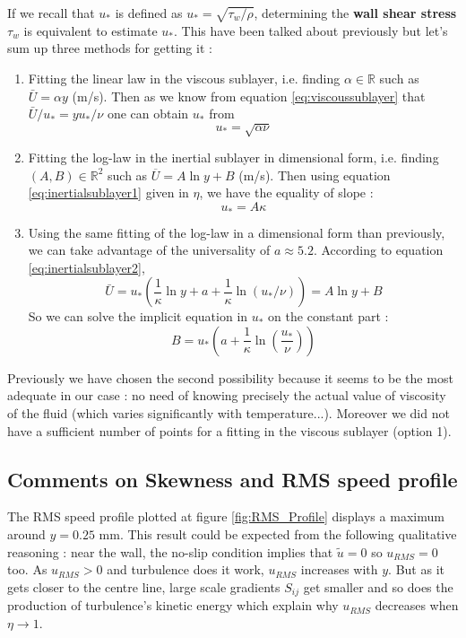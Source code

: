 \documentclass[12pt]{article}
\begin{document}
If we recall that $u_*$ is defined as $u_* = \sqrt{\tau_w/\rho}$, determining the \textbf{wall shear stress} $\tau_w$ is equivalent to estimate $u_*$. This have been talked about previously but let's sum up three methods for getting it :
\begin{enumerate}
    \item Fitting the linear law in the viscous sublayer, i.e. finding $\alpha \in \mathbb{R}$ such as $\bar{U} = \alpha y$ (m/s). Then as we know from equation \ref{eq:viscoussublayer} that $\bar{U}/u_* = yu_*/\nu$ one can obtain $u_*$ from 
    \begin{equation}
        u_* = \sqrt{\alpha \nu}
    \end{equation}
    \item Fitting the log-law in the inertial sublayer in dimensional form, i.e. finding $(A,B) \in \mathbb{R}^2$ such as $\overline{U} = A \ln y + B$ (m/s). Then using equation \ref{eq:inertialsublayer1} given in $\eta$, we have the equality of slope :
    \begin{equation}
        u_* = A\kappa
    \end{equation}
    \item Using the same fitting of the log-law in a dimensional form than previously, we can take advantage of the universality of $a \approx 5.2$. According to equation \ref{eq:inertialsublayer2}, 
    $$\bar{U} = u_* \left( \frac{1}{\kappa}\ln y + a + \frac{1}{\kappa}\ln(u_*/\nu) \right) = A \ln y +  B$$ 
    So we can solve the implicit equation in $u_*$ on the constant part :
    \begin{equation}
        B = u_*\left( a + \frac{1}{\kappa} \ln \left( \frac{u_*}{\nu} \right) \right)
    \end{equation}
\end{enumerate}

Previously we have chosen the second possibility because it seems to be the most adequate in our case : no need of knowing precisely the actual value of viscosity of the fluid (which varies significantly with temperature...). Moreover we did not have a sufficient number of points for a fitting in the viscous sublayer (option 1).

\subsection{Comments on Skewness and RMS speed profile}

The RMS speed profile plotted at figure \ref{fig:RMS_Profile} displays a maximum around $y = 0.25$ \si{mm}. This result could be expected from the following qualitative reasoning : near the wall, the no-slip condition implies that $\tilde{u} = 0$ so $u_{RMS} = 0$ too. As $u_{RMS} > 0$ and turbulence does it work, $u_{RMS}$ increases with $y$. But as it gets closer to the centre line, large scale gradients $S_{ij}$ get smaller and so does the production of turbulence's kinetic energy which explain why $u_{RMS}$ decreases when $\eta \rightarrow 1$.\\
\end{document}
